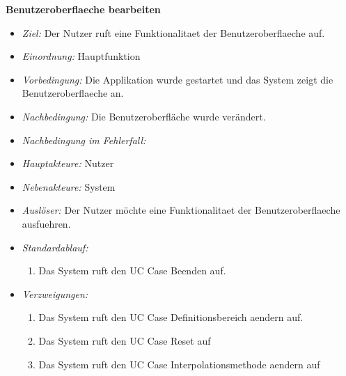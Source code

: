 \textbf{Benutzeroberflaeche bearbeiten}
  \begin{itemize}
  \item \textit{Ziel:} Der Nutzer ruft eine Funktionalitaet der Benutzeroberflaeche auf.
  \item \textit{Einordnung:} Hauptfunktion
  \item \textit{Vorbedingung:} Die Applikation wurde gestartet und das System zeigt die Benutzeroberflaeche an.
  \item \textit{Nachbedingung:} Die Benutzeroberfl\"ache wurde ver\"andert.
  \item \textit{Nachbedingung im Fehlerfall:} 
  \item \textit{Hauptakteure:} Nutzer
  \item \textit{Nebenakteure:} System
  \item \textit{Ausl\"oser:} Der Nutzer m\"ochte eine Funktionalitaet der Benutzeroberflaeche ausfuehren.
  \item \textit{Standardablauf:}
    \begin{enumerate}[label=(\arabic*)]
    \item Das System ruft den UC Case Beenden auf.
    \end{enumerate}
  \item \textit{Verzweigungen:}
    \begin{enumerate}[label=(1\alph*)]
\item Das System ruft den UC Case Definitionsbereich aendern auf.
\item Das System ruft den UC Case Reset auf
\item Das System ruft den UC Case Interpolationsmethode aendern auf
    \end{enumerate}
  \end{itemize}
